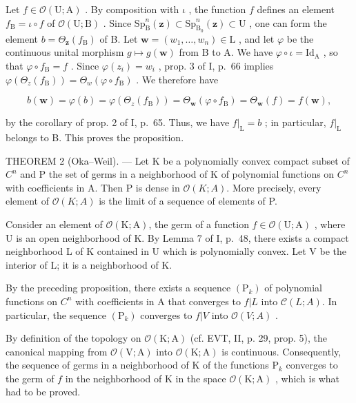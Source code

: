 Let \(f \in \mathcal{O}(\mathrm{U};\mathrm{A})\) . By composition with \(\iota\) , the function \(f\) defines an element \(f_{\mathrm{B}} = \iota \circ f\) of \(\mathcal{O}(\mathrm{U};\mathrm{B})\) . Since \(\mathrm{Sp}_{\mathrm{B}}^{n}(\boldsymbol{z}) \subset \mathrm{Sp}_{\mathrm{B}_{0}}^{n}(\boldsymbol{z}) \subset \mathrm{U}\) , one can form the element \(b = \Theta_{\boldsymbol{z}}(f_{\mathrm{B}})\) of B. Let \(\boldsymbol{w} = (w_{1},\ldots ,w_{n}) \in \mathrm{L}\) , and let \(\varphi\) be the continuous unital morphism \(g \mapsto g(\boldsymbol{w})\) from B to A. We have \(\varphi \circ \iota = \mathrm{Id}_{\mathrm{A}}\) , so that \(\varphi \circ f_{\mathrm{B}} = f\) . Since \(\varphi (z_i) = w_i\) , prop. 3 of I, p.~66 implies \(\varphi (\Theta_z(f_{\mathrm{B}})) = \Theta_w(\varphi \circ f_{\mathrm{B}})\) . We therefore have

\[
b (\pmb {w}) = \varphi (b) = \varphi (\Theta_ {z} (f _ {\mathrm{B}})) = \Theta_ {\pmb {w}} (\varphi \circ f _ {\mathrm{B}}) = \Theta_ {\pmb {w}} (f) = f (\pmb {w}),
\]

by the corollary of prop. 2 of I, p.~65. Thus, we have \(f|_{\mathrm{L}} = b\) ; in particular, \(f|_{\mathrm{L}}\) belongs to B. This proves the proposition.

THEOREM 2 (Oka--Weil). --- Let K be a polynomially convex compact subset of \(C^{n}\) and P the set of germs in a neighborhood of K of polynomial functions on \(C^{n}\) with coefficients in A. Then P is dense in \(\mathcal{O}(K;A)\). More precisely, every element of \(\mathcal{O}(K;A)\) is the limit of a sequence of elements of P.

Consider an element of \(\mathcal{O}(\mathrm{K};\mathrm{A})\), the germ of a function \(f\in \mathcal{O}(\mathrm{U};\mathrm{A})\) , where U is an open neighborhood of K. By Lemma 7 of I, p.~48, there exists a compact neighborhood L of K contained in U which is polynomially convex. Let V be the interior of L; it is a neighborhood of K.

By the preceding proposition, there exists a sequence \((\mathrm{P}_{k})\) of polynomial functions on \(C^{n}\) with coefficients in A that converges to \(f|L\) into \(\mathcal{C}(L;A)\). In particular, the sequence \((\mathrm{P}_{k})\) converges to \(f|V\) into \(\mathcal{O}(V;A)\) .

By definition of the topology on \(\mathcal{O}(\mathrm{K};\mathrm{A})\) (cf. EVT, II, p. 29, prop. 5), the canonical mapping from \(\mathcal{O}(\mathrm{V};\mathrm{A})\) into \(\mathcal{O}(\mathrm{K};\mathrm{A})\) is continuous. Consequently, the sequence of germs in a neighborhood of K of the functions \(\mathrm{P}_k\) converges to the germ of \(f\) in the neighborhood of K in the space \(\mathcal{O}(\mathrm{K};\mathrm{A})\) , which is what had to be proved.

